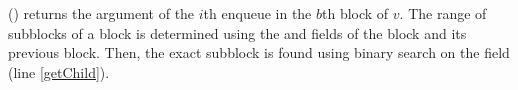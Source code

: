 () returns the argument of the
$i$th enqueue in the $b$th block of  $v$. 
The range of subblocks of a block is determined using the  and
 fields of the block and its previous block. Then,
the exact subblock is found using binary search on the 
field (line \ref{getChild}). 



